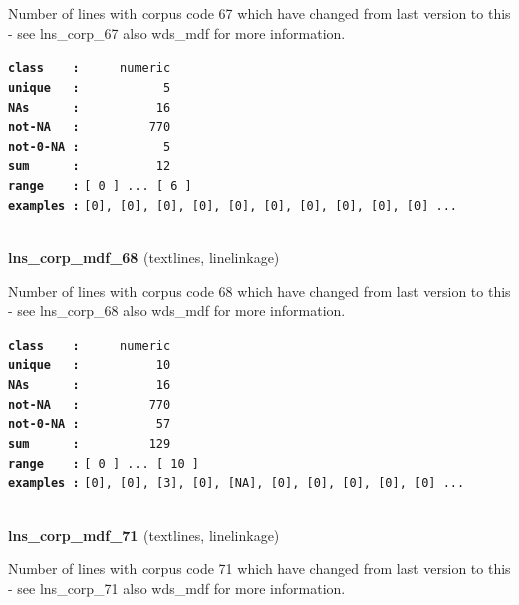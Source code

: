 \documentclass[]{article}
\begin{document}
Number of lines with corpus code 67 which have changed from last version
to this - see lns\_corp\_67 also wds\_mdf for more information.

\textbf{\texttt{class\ \ \ \ :}} \texttt{~~~~~numeric}\\
\textbf{\texttt{unique\ \ \ :}} \texttt{~~~~~~~~~~~5}\\
\textbf{\texttt{NAs\ \ \ \ \ \ :}} \texttt{~~~~~~~~~~16}\\
\textbf{\texttt{not-NA\ \ \ :}} \texttt{~~~~~~~~~770}\\
\textbf{\texttt{not-0-NA\ :}} \texttt{~~~~~~~~~~~5}\\
\textbf{\texttt{sum\ \ \ \ \ \ :}} \texttt{~~~~~~~~~~12}\\
\textbf{\texttt{range\ \ \ \ :}}
\texttt{{[}\ 0\ {]}\ ...\ {[}\ 6\ {]}}\\
\textbf{\texttt{examples\ :}}
\texttt{{[}0{]},\ {[}0{]},\ {[}0{]},\ {[}0{]},\ {[}0{]},\ {[}0{]},\ {[}0{]},\ {[}0{]},\ {[}0{]},\ {[}0{]}\ ...}\\

~

\textbf{lns\_corp\_mdf\_68} (textlines, linelinkage)

Number of lines with corpus code 68 which have changed from last version
to this - see lns\_corp\_68 also wds\_mdf for more information.

\textbf{\texttt{class\ \ \ \ :}} \texttt{~~~~~numeric}\\
\textbf{\texttt{unique\ \ \ :}} \texttt{~~~~~~~~~~10}\\
\textbf{\texttt{NAs\ \ \ \ \ \ :}} \texttt{~~~~~~~~~~16}\\
\textbf{\texttt{not-NA\ \ \ :}} \texttt{~~~~~~~~~770}\\
\textbf{\texttt{not-0-NA\ :}} \texttt{~~~~~~~~~~57}\\
\textbf{\texttt{sum\ \ \ \ \ \ :}} \texttt{~~~~~~~~~129}\\
\textbf{\texttt{range\ \ \ \ :}}
\texttt{{[}\ 0\ {]}\ ...\ {[}\ 10\ {]}}\\
\textbf{\texttt{examples\ :}}
\texttt{{[}0{]},\ {[}0{]},\ {[}3{]},\ {[}0{]},\ {[}NA{]},\ {[}0{]},\ {[}0{]},\ {[}0{]},\ {[}0{]},\ {[}0{]}\ ...}\\

~

\textbf{lns\_corp\_mdf\_71} (textlines, linelinkage)

Number of lines with corpus code 71 which have changed from last version
to this - see lns\_corp\_71 also wds\_mdf for more information.
\end{document}

